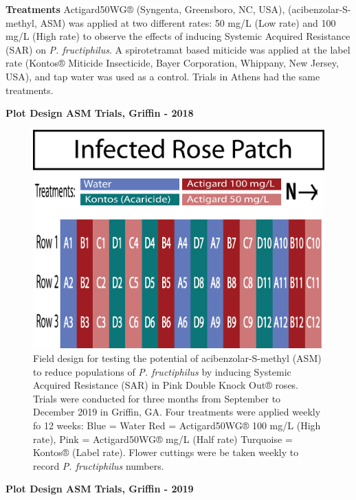 \documentclass{ufdissertation}[overrideChapters] %
\begin{document}
{\textbf{Treatments}
Actigard50WG® (Syngenta, Greensboro, NC, USA), (acibenzolar-S-methyl, ASM) was applied at two different rates: 50 \si{\milli\gram}/\si{\liter} (Low rate) and 100 \si{\milli\gram}/\si{\liter} (High rate) to observe the effects of inducing Systemic Acquired Resistance (SAR) on \emph{P. fructiphilus}. A spirotetramat based miticide was applied at the label rate (Kontos® Miticide Insecticide, Bayer Corporation, Whippany, New Jersey, USA), and tap water was used as a control. Trials in Athens had the same treatments.

\textbf{Plot Design ASM Trials, Griffin - 2018}
\begin{figure}

{\centering \includegraphics[width=1\linewidth]{figure/rrv_asm_plot_2018_griffin} 

}

\caption[Field design for testing the potential of acibenzolar-S-methyl (ASM) to reduce populations of \textit{P. fructiphilus}]{Field design for testing the potential of acibenzolar-S-methyl (ASM) to reduce populations of \textit{P. fructiphilus} by inducing Systemic Acquired Resistance (SAR) in Pink Double Knock Out® roses. Trials were conducted for three months from September to December 2019 in Griffin, GA. Four treatments were applied weekly fo 12 weeks: Blue = Water Red = Actigard50WG® 100 \si{\milli\gram}/L (High rate),  Pink = Actigard50WG® \si{\milli\gram}/L (Half rate) Turquoise = Kontos® (Label rate). Flower cuttings were be taken weekly to record \textit{P. fructiphilus} numbers.}\label{fig:grif-asm-2018}
\end{figure}
\textbf{Plot Design ASM Trials, Griffin - 2019}
\begin{figure}


\end{figure}}
\end{document}

